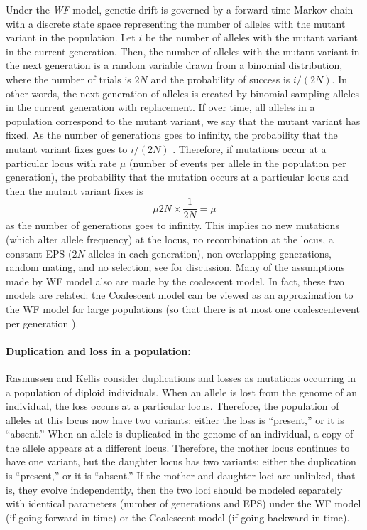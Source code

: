 Under the \textit{\gls{WF}} \cite{wakley2009coalescent} model, genetic drift is governed by a forward-time 
\clearpage
\noindent  Markov chain with a discrete state space representing the number of alleles with the mutant variant in the population.
Let $i$ be the number of alleles with the mutant variant in the current generation.
Then, the number of alleles with the mutant variant in the next generation is a random variable drawn from a binomial distribution, where the number of trials is $2N$ and the probability of success is $i/(2N)$.
In other words, the next generation of alleles is created by binomial sampling alleles in the current generation with replacement.
If over time, all alleles in a population correspond to the mutant variant, we say that the mutant variant has fixed.
As the number of generations goes to infinity, the probability that the mutant variant fixes goes to $i / (2N)$ \cite{wakley2009coalescent}.
Therefore, if mutations occur at a particular locus with rate $\mu$ (number of events per allele in the population per generation), the probability that the mutation occurs at a particular locus and then the mutant variant fixes is
\begin{equation}
	\mu 2 N \times \frac{1}{2 N} = \mu
\end{equation}
as the number of generations goes to infinity.
This implies no new mutations (which alter allele frequency) at the locus, no recombination at the locus, a constant \gls{EPS} ($2N$ alleles in each generation), non-overlapping generations, random mating, and no selection; see \cite{wakley2009coalescent} for discussion.
Many of the assumptions made by WF model also are made by the \Gls{coalescent} model.
In fact, these two models are related: the Coalescent model can be viewed as an approximation to the WF model for large populations (so that there is at most one \gls{coalescentevent} per generation \cite{tataru2016statistical}).

\paragraph{Duplication and loss in a population:} 
Rasmussen and Kellis \cite{rasmussen2012unified} consider duplications and losses as mutations occurring in a population of diploid individuals.
When an allele is lost from the genome of an individual, the loss occurs at a particular locus.
Therefore, the population of alleles at this locus now have two variants: either the loss is ``present,'' or it is ``absent.''
When an allele is duplicated in the genome of an individual, a copy of the allele appears at a different locus.
Therefore, the mother locus continues to have one variant, but the daughter locus has two variants: either the duplication is ``present,'' or it is ``absent.''
If the mother and daughter loci are unlinked, that is, they evolve independently, then the two loci should be modeled separately with identical parameters (number of generations and EPS) under the WF model (if going forward in time) or the Coalescent model (if going backward in time).

